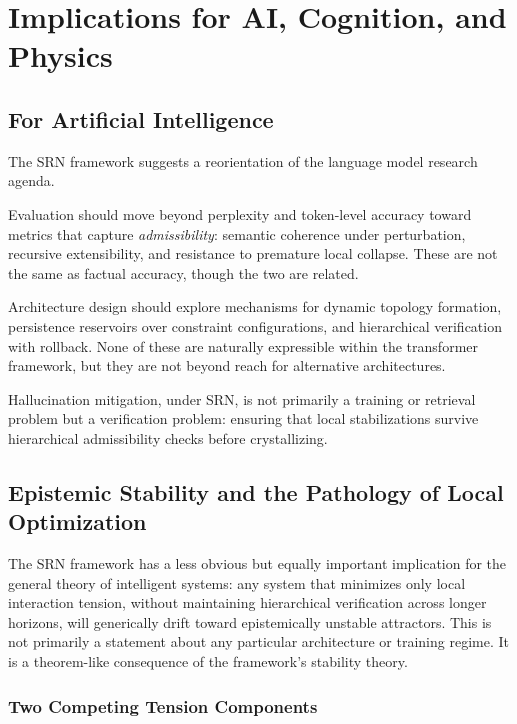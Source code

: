 \documentclass[11pt, a4paper]{article}
\theoremstyle{srn}
\theoremstyle{srnremark}
\begin{document}
\section{Implications for AI, Cognition, and Physics}
\label{sec:implications}

\subsection{For Artificial Intelligence}

The SRN framework suggests a reorientation of the language model
research agenda.

Evaluation should move beyond perplexity and token-level accuracy
toward metrics that capture \emph{admissibility}: semantic coherence
under perturbation, recursive extensibility, and resistance to
premature local collapse.
These are not the same as factual accuracy, though the two are related.

Architecture design should explore mechanisms for dynamic topology
formation, persistence reservoirs over constraint configurations, and
hierarchical verification with rollback.
None of these are naturally expressible within the transformer
framework, but they are not beyond reach for alternative architectures.

Hallucination mitigation, under SRN, is not primarily a training or
retrieval problem but a verification problem: ensuring that local
stabilizations survive hierarchical admissibility checks before
crystallizing.


\subsection{Epistemic Stability and the Pathology of Local Optimization}

The SRN framework has a less obvious but equally important implication
for the general theory of intelligent systems: any system that
minimizes only local interaction tension, without maintaining
hierarchical verification across longer horizons, will generically
drift toward epistemically unstable attractors.
This is not primarily a statement about any particular architecture
or training regime.
It is a theorem-like consequence of the framework's stability theory.

\subsubsection*{Two Competing Tension Components}
\end{document}
